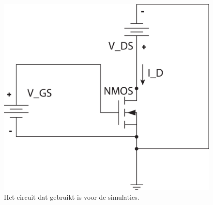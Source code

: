 \documentclass{scrartcl}  %
\begin{document}
\begin{figure}[H]
\centering
	\includegraphics[width=\textwidth]{resources/NMOS_circuit}
	\caption{Het circuit dat gebruikt is voor de simulaties.}
	\label{fig:circuit}
\end{figure}
\end{document}

